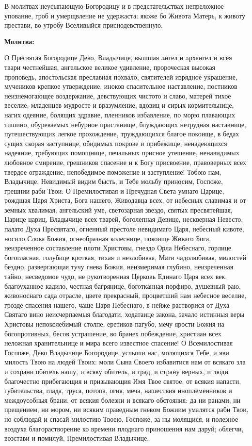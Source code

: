 В молитвах неусыпающую Богородицу и в предстательствах непреложное упование, гроб и умерщвление не удержаста: якоже бо Живота Матерь, к животу престави, во утробу Вселивыйся приснодевственную.


\medskip


\bfseries Молитва:\normalfont{}\nopagebreak


О Пресвятая Богородице Дево, Владычице, вышшая aнгел и aрхангел и всея твари честнейшая, ангельское великое удивление, пророческая высокая проповедь, апостольская преславная похвало, святителей изрядное украшение, мучеников крепкое утверждение, иноков спасительное наставление, постников неизнемогающее воздержание, девствующих чистото и славо, матерей тихое веселие, младенцев мудросте и вразумление, вдовиц и сирых кормительнице, нагих одеяние, болящих здравие, пленников избавление, по морю плавающих тишино, обуреваемых небурное пристанище, блуждающих нетрудная наставнице, путешествующих легкое прохождение, труждающихся благое покоище, в бедах сущих скорая заступнице, обидимых покрове и прибежище, ненадеющихся надеяние, требующих помощнице, печальных присное утешение, ненавидимых любовное смирение, грешников спасение и к Богу присвоение, правоверных всех твердое ограждение, непобедимое поможение и заступление! Тобою нам, Владычице, Невидимый видим бысть, и Тебе мольбу приносим, Госпоже, грешнии раби Твои: О Премилостивая и Пречудная Света умнаго Царице, рождшая Царя Христа, Бога нашего, Живодавца всех, от небесных славимая и от земных хвалимая, ангельский уме, светозарная звездо, святых пресвятейшая, Царице цариц, Владычице всех тварей, боголепная Девице, нескверная Невесто, палато Духа Пресвятаго, огненный престоле невидимаго Царя, небесный кивоте, носило Слова Божия, огнеобразная колеснице, покоище Живаго Бога, неизреченное составление плоти Христовы, гнездо Орла Небеснаго, горлице богогласная, голубице кроткая, тихая и незлобивая, Мати чадолюбивая, милостей бездно, развергающая тучу гнева Божия, неизмеримая глубино, неизреченная тайно, несведомое чудо, не рукотворенная Церковь Единаго Царя всех век, благоуханное кадило, честная багрянице, боготканная порфиро, душевный раю, живоноснаго сада отрасле, цвете прекрасный, процветший нам небесное веселие, грозде спасения нашего, чаше Царя Небеснаго, в нейже растворися от Духа Святаго вино неисчерпаемыя благодати, ходатаице закона, зачало истинныя веры Христовы непоколебимый столпе, еретиков пагубо, мечу ярости Божия на богопротивных, бесов устрашение, во бранех побеждение, христиан всех неложная хранительнице и мира всего известное спасение! О Всемилостивая Госпоже, Дево Владычице Богородице, услыши нас, молящихся Тебе, и яви милость Твою на людей Твоих: моли Сына Своего избавитися нам от всякаго зла и сохрани обитель нашу, и всяку обитель, и град, и страну верных, и люди благочестно прибегающия и призывающия Имя Твое святое, от всякия напасти, губительства, глада, труса, потопа, огня, меча, нашествия иноплеменников и междоусобныя брани, от всякия болезни и всякаго обстояния: да ни ранами, ни прещением, ни мором, ни всяким праведным гневом Божиим умалятся раби Твои, но соблюдай и спасай милостию Твоею, Госпоже, за ны молящися, и полезное воздуха благорастворение ко времени плоднаго приношения нам даруй; oблегчи, возстави и помилуй, Премилостивая Владычице, 